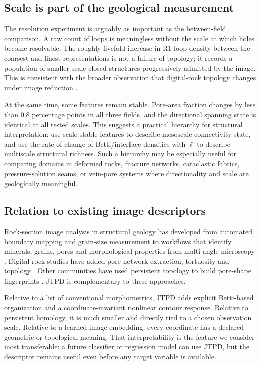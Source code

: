 \documentclass[preprint,12pt,authoryear]{elsarticle}
\begin{document}
\subsection{Scale is part of the geological measurement}

The resolution experiment is arguably as important as the between-field comparison. A raw count of loops is meaningless without the scale at which holes become resolvable. The roughly fivefold increase in R1 loop density between the coarsest and finest representations is not a failure of topology; it records a population of smaller-scale closed structures progressively admitted by the image. This is consistent with the broader observation that digital-rock topology changes under image reduction \citep{Prokhorov2021}.

At the same time, some features remain stable. Pore-area fraction changes by less than 0.8 percentage points in all three fields, and the directional spanning state is identical at all tested scales. This suggests a practical hierarchy for structural interpretation: use scale-stable features to describe mesoscale connectivity state, and use the rate of change of Betti/interface densities with $\ell$ to describe multiscale structural richness. Such a hierarchy may be especially useful for comparing domains in deformed rocks, fracture networks, cataclastic fabrics, pressure-solution seams, or vein-pore systems where directionality and scale are geologically meaningful.

\subsection{Relation to existing image descriptors}

Rock-section image analysis in structural geology has developed from automated boundary mapping and grain-size measurement \citep{Heilbronner2000} to workflows that identify minerals, grains, pores and morphological properties from multi-angle microscopy \citep{Zhang2020}. Digital-rock studies have added pore-network extraction, tortuosity and topology \citep{Blunt2013,Fu2021,Wang2022}. Other communities have used persistent topology to build pore-shape fingerprints \citep{Lee2017}. JTPD is complementary to these approaches.

Relative to a list of conventional morphometrics, JTPD adds explicit Betti-based organization and a coordinate-invariant nonlinear contour response. Relative to persistent homology, it is much smaller and directly tied to a chosen observation scale. Relative to a learned image embedding, every coordinate has a declared geometric or topological meaning. That interpretability is the feature we consider most transferable: a future classifier or regression model can use JTPD, but the descriptor remains useful even before any target variable is available.
\end{document}
